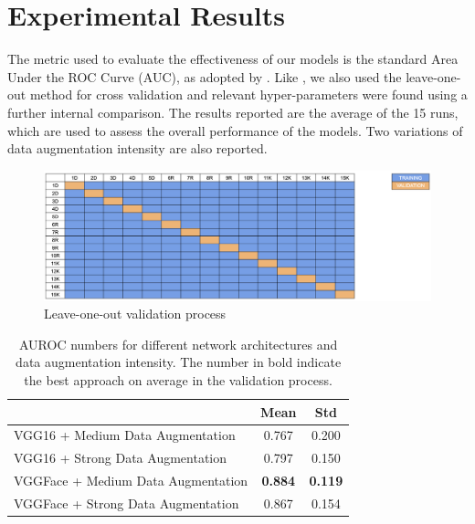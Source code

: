\chapter{Experimental Results}

The metric used to evaluate the effectiveness of our models is the standard Area Under the ROC Curve (AUC), as adopted by \cite{abs-1807-01631}. Like \cite{CelonaM17}, we also used the leave-one-out method for cross validation and relevant hyper-parameters were found using a further internal comparison. The results reported are the average of the 15 runs, which are used to assess the overall performance of the models. Two variations of data augmentation intensity are also reported.

\begin{figure}[h!tp]
    \centering
    \includegraphics[width=1\textwidth]{imgs/chap4_validation.png}
    \caption{Leave-one-out validation process}
    \label{fig:validation}
\end{figure}

\begin{table}[h!]
\centering
\caption{AUROC numbers for different network architectures and data augmentation intensity. The number in bold indicate the best approach on average in the validation process.}
\label{tab:results}
\begin{tabular}{lcc}
\hline
\multicolumn{1}{c}{}               & Mean           & Std            \\ \hline
VGG16 + Medium Data Augmentation   & 0.767          & 0.200          \\
VGG16 + Strong Data Augmentation   & 0.797          & 0.150          \\
VGGFace + Medium Data Augmentation & \textbf{0.884} & \textbf{0.119} \\
VGGFace + Strong Data Augmentation & 0.867          & 0.154          \\ \hline
\end{tabular}
\end{table}

